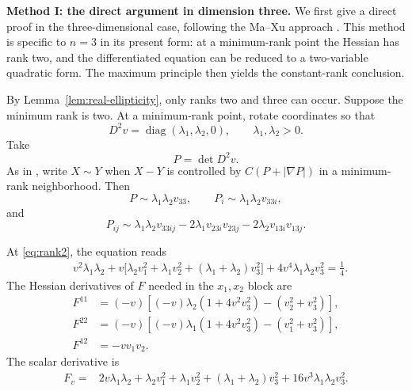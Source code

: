 \documentclass{article}
\newcommand{\diag}{\operatorname{diag}}
\numberwithin{equation}{section}
\begin{document}
\medskip
\noindent\textbf{Method I: the direct argument in dimension three.}
We first give a direct proof in the three-dimensional case, following the
Ma--Xu approach \cite{MX08}. This method is specific to $n=3$ in its present
form: at a minimum-rank point the Hessian has rank two, and the differentiated
equation can be reduced to a two-variable quadratic form. The maximum
principle then yields the constant-rank conclusion.

By Lemma~\ref{lem:real-ellipticity}, only ranks two and three can occur. Suppose the minimum rank is two. At a minimum-rank point, rotate coordinates so that
\begin{equation}\label{eq:rank2}
D^2v=\diag(\lambda_1,\lambda_2,0),
\qquad \lambda_1,\lambda_2>0.
\end{equation}
Take
\begin{equation}\label{eq:Pdet}
P=\det D^2v.
\end{equation}
As in \cite{MX08}, write $X\sim Y$ when $X-Y$ is controlled by $C(P+|\nabla P|)$ in a minimum-rank neighborhood. Then
\begin{equation}\label{eq:Pderivatives}
P\sim\lambda_1\lambda_2v_{33},
\qquad
P_i\sim\lambda_1\lambda_2v_{33i},
\end{equation}
and
\begin{equation}\label{eq:Pij-main}
P_{ij}\sim
\lambda_1\lambda_2v_{33ij}
-2\lambda_1v_{23i}v_{23j}
-2\lambda_2v_{13i}v_{13j}.
\end{equation}

At \eqref{eq:rank2}, the equation reads
\begin{align}
&v^2\lambda_1\lambda_2
+v\bigl[
\lambda_2v_1^2+\lambda_1v_2^2+(\lambda_1+\lambda_2)v_3^2
\bigr]
+4v^4\lambda_1\lambda_2v_3^2
=\frac14.
\label{eq:rank2eq}
\end{align}
The Hessian derivatives of $F$ needed in the $x_1,x_2$ block are
\begin{align}
F^{11}
&=(-v)\left[(-v)\lambda_2(1+4v^2v_3^2)-(v_2^2+v_3^2)\right],
\label{eq:F11-main}\\
F^{22}
&=(-v)\left[(-v)\lambda_1(1+4v^2v_3^2)-(v_1^2+v_3^2)\right],
\label{eq:F22-main}\\
F^{12}&=-vv_1v_2.
\label{eq:F12-main}
\end{align}
The scalar derivative is
\begin{align}
F_v
={}&2v\lambda_1\lambda_2
+\lambda_2v_1^2+\lambda_1v_2^2+(\lambda_1+\lambda_2)v_3^2
+16v^3\lambda_1\lambda_2v_3^2.
\label{eq:Fv-main}
\end{align}
\end{document}
